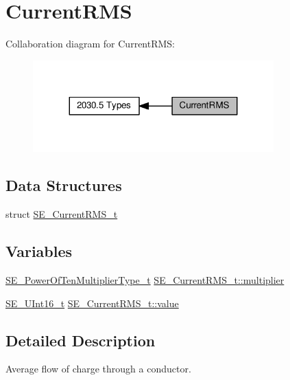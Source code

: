 \hypertarget{group__CurrentRMS}{}\section{Current\+R\+MS}
\label{group__CurrentRMS}
Collaboration diagram for Current\+R\+MS\+:\nopagebreak
\begin{figure}[H]
\begin{center}
\leavevmode
\includegraphics[width=263pt]{group__CurrentRMS}
\end{center}
\end{figure}
\subsection*{Data Structures}
\begin{DoxyCompactItemize}
\item 
struct \hyperlink{structSE__CurrentRMS__t}{S\+E\+\_\+\+Current\+R\+M\+S\+\_\+t}
\end{DoxyCompactItemize}
\subsection*{Variables}
\begin{DoxyCompactItemize}
\item 
\hyperlink{group__PowerOfTenMultiplierType_gaf0317b781dc8dbb9cb6ac4e44a14fdef}{S\+E\+\_\+\+Power\+Of\+Ten\+Multiplier\+Type\+\_\+t} \hyperlink{group__CurrentRMS_gac4c5d99f23cf05c7dceadc6db6f17591}{S\+E\+\_\+\+Current\+R\+M\+S\+\_\+t\+::multiplier}
\item 
\hyperlink{group__UInt16_gac68d541f189538bfd30cfaa712d20d29}{S\+E\+\_\+\+U\+Int16\+\_\+t} \hyperlink{group__CurrentRMS_ga37b6aaf021db943b1c3e4cee427b7725}{S\+E\+\_\+\+Current\+R\+M\+S\+\_\+t\+::value}
\end{DoxyCompactItemize}


\subsection{Detailed Description}
Average flow of charge through a conductor. 

